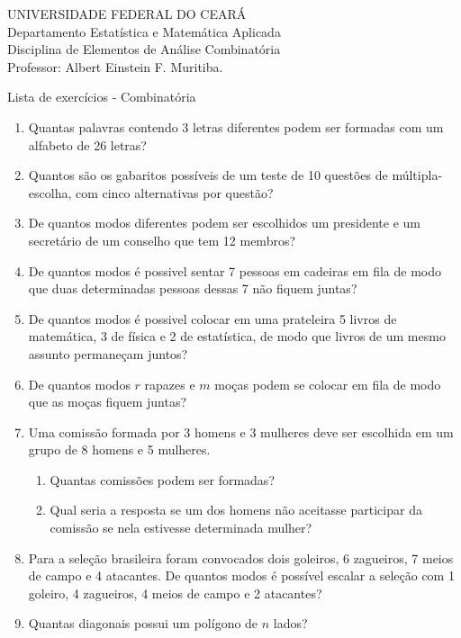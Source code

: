 \documentclass[a4paper,12pt]{letter}  %
\begin{document}
UNIVERSIDADE FEDERAL DO CEARÁ\\
Departamento Estatística e Matemática Aplicada\\
Disciplina de Elementos de Análise Combinatória\\
Professor: Albert Einstein F. Muritiba.\\

\begin{center}
	Lista de exercícios - Combinatória
\end{center}

\begin{enumerate}
	\item Quantas palavras contendo 3 letras diferentes podem ser formadas com um alfabeto de 26 letras?
	\item Quantos são os gabaritos possíveis de um teste de 10 questões de múltipla-escolha, com cinco alternativas por questão?
	\item De quantos modos diferentes podem ser escolhidos um presidente e um secretário de um conselho que tem 12 membros?
    
	\item De quantos modos é possivel sentar 7 pessoas em cadeiras em fila de modo que duas determinadas pessoas dessas 7 não fiquem juntas?
	\item De quantos modos é possivel colocar em uma prateleira 5 livros de matemática, 3 de física e 2 de estatística, de modo que livros de um mesmo assunto permaneçam juntos?
	\item De quantos modos $r$ rapazes e $m$ moças podem se colocar em fila de modo que as moças fiquem juntas?
    
	\item Uma comissão formada por 3 homens e 3 mulheres deve ser escolhida em um grupo de 8 homens e 5 mulheres.
	\begin{enumerate}
        \item Quantas comissões podem ser formadas?
        \item Qual seria a resposta se um dos homens não aceitasse participar da comissão se nela estivesse determinada mulher?
    \end{enumerate}
	\item Para a seleção brasileira foram convocados dois goleiros, 6 zagueiros, 7 meios de campo e 4 atacantes. De quantos modos é possível escalar a seleção com 1 goleiro, 4 zagueiros, 4 meios de campo e 2 atacantes?
	\item Quantas diagonais possui um polígono de $n$ lados?


\end{enumerate}
\end{document}
